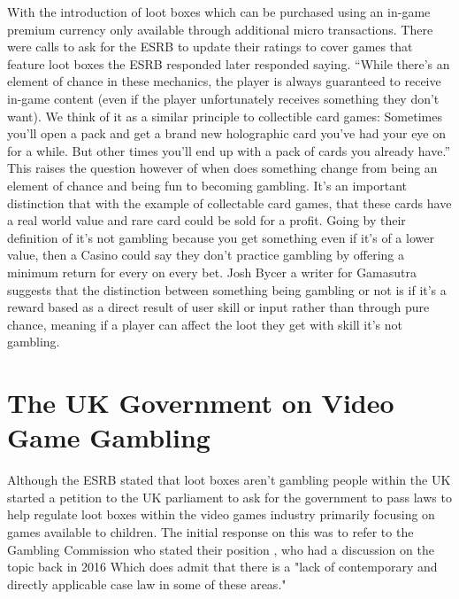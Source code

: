 \documentclass{scrartcl}
\begin{document}
With the introduction of loot boxes which can be purchased using an in-game premium currency only available through additional micro transactions. There were calls to ask for the ESRB to update their ratings to cover games that feature loot boxes the ESRB responded later responded saying. “While there’s an element of chance in these mechanics, the player is always guaranteed to receive in-game content (even if the player unfortunately receives something they don’t want). We think of it as a similar principle to collectible card games: Sometimes you’ll open a pack and get a brand new holographic card you’ve had your eye on for a while. But other times you’ll end up with a pack of cards you already have.” \cite{Jason2017ESRB} This raises the question however of when does something change from being an element of chance and being fun to becoming gambling. It's an important distinction that with the example of collectable card games, that these cards have a real world value and rare card could be sold for a profit. Going by their definition of it's not gambling because you get something even if it's of a lower value, then a Casino could say they don't practice gambling by offering a minimum return for every on every bet. Josh Bycer a writer for Gamasutra \cite{Josh2017Loot} suggests that the distinction between something being gambling or not is if it's a reward based as a direct result of user skill or input rather than through pure chance, meaning if a player can affect the loot they get with skill it's not gambling.

\section{The UK Government on Video Game Gambling}
Although the ESRB stated that loot boxes aren't gambling people within the UK started a petition to the UK parliament to ask for the government to pass laws to help regulate loot boxes within the video games industry primarily focusing on games available to children. The initial response on this was to refer to the Gambling Commission who stated their position \cite{GamCom2017position}, who had a discussion on the topic back in 2016 \cite{GamCom2016discussion} Which does admit that there is a "lack of contemporary and directly applicable case law in some of these areas." 
\end{document}
